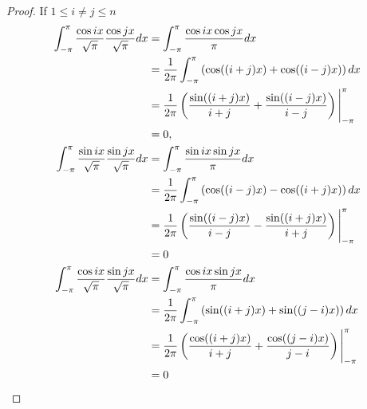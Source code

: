 \begin{proof}
    If $1\leq i\ne j\leq n$
    \begingroup
    \allowdisplaybreaks{}
    \begin{align*}
        \int^{\pi}_{-\pi}\frac{\cos ix}{\sqrt{\pi}}\frac{\cos jx}{\sqrt{\pi}}dx & = \int^{\pi}_{-\pi}\frac{\cos ix \cos jx}{\pi}dx                                                                     \\
                                                                                & = \frac{1}{2\pi}\int^{\pi}_{-\pi}\left(\cos((i + j)x) + \cos((i - j)x)\right)dx                                      \\
                                                                                & = \frac{1}{2\pi}\left(\frac{\sin ((i + j)x)}{i + j} + \frac{\sin ((i - j)x)}{i - j}\right)\Biggl{\vert}^{\pi}_{-\pi} \\
                                                                                & = 0,                                                                                                                 \\
        \int^{\pi}_{-\pi}\frac{\sin ix}{\sqrt{\pi}}\frac{\sin jx}{\sqrt{\pi}}dx & = \int^{\pi}_{-\pi}\frac{\sin ix \sin jx}{\pi}dx                                                                     \\
                                                                                & = \frac{1}{2\pi}\int^{\pi}_{-\pi}\left(\cos((i - j)x) - \cos((i + j)x)\right)dx                                      \\
                                                                                & = \frac{1}{2\pi}\left(\frac{\sin ((i - j)x)}{i - j} - \frac{\sin ((i + j)x)}{i + j}\right)\Biggl{\vert}^{\pi}_{-\pi} \\
                                                                                & = 0                                                                                                                  \\
        \int^{\pi}_{-\pi}\frac{\cos ix}{\sqrt{\pi}}\frac{\sin jx}{\sqrt{\pi}}dx & = \int^{\pi}_{-\pi}\frac{\cos ix \sin jx}{\pi}dx                                                                     \\
                                                                                & = \frac{1}{2\pi}\int^{\pi}_{-\pi}\left(\sin((i + j)x) + \sin((j - i)x)\right)dx                                      \\
                                                                                & = \frac{1}{2\pi}\left(\frac{\cos ((i + j)x)}{i + j} + \frac{\cos ((j - i)x)}{j - i}\right)\Biggl{\vert}^{\pi}_{-\pi} \\
                                                                                & = 0
    \end{align*}
    \endgroup


\end{proof}
